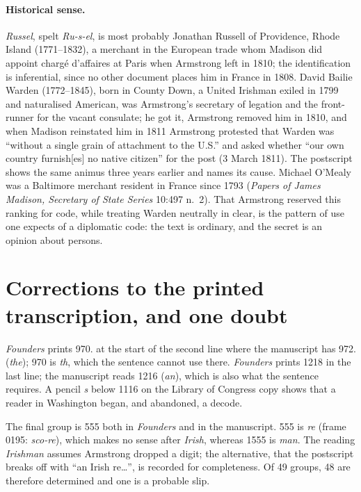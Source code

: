 \documentclass[]{interact}
\newcommand{\grp}[1]{\textsf{#1}}
\begin{document}
\paragraph{Historical sense.} \emph{Russel}, spelt \emph{Ru-s-el}, is most probably Jonathan Russell of Providence, Rhode Island (1771--1832), a merchant in the European trade whom Madison did appoint charg\'e d'affaires at Paris when Armstrong left in 1810; the identification is inferential, since no other document places him in France in 1808. David Bailie Warden (1772--1845), born in County Down, a United Irishman exiled in 1799 and naturalised American, was Armstrong's secretary of legation and the front-runner for the vacant consulate; he got it, Armstrong removed him in 1810, and when Madison reinstated him in 1811 Armstrong protested that Warden was ``without a single grain of attachment to the U.S.'' and asked whether ``our own country furnish[es] no native citizen'' for the post (3 March 1811). The postscript shows the same animus three years earlier and names its cause. Michael O'Mealy was a Baltimore merchant resident in France since 1793 (\emph{Papers of James Madison, Secretary of State Series} 10:497 n.~2). That Armstrong reserved this ranking for code, while treating Warden neutrally in clear, is the pattern of use one expects of a diplomatic code: the text is ordinary, and the secret is an opinion about persons.

\section{Corrections to the printed transcription, and one doubt}\label{sec:corr}

\emph{Founders} prints \grp{970.} at the start of the second line where the manuscript has \grp{972.} (\emph{the}); \grp{970} is \emph{th}, which the sentence cannot use there. \emph{Founders} prints \grp{1218} in the last line; the manuscript reads \grp{1216} (\emph{an}), which is also what the sentence requires. A pencil \emph{s} below \grp{1116} on the Library of Congress copy shows that a reader in Washington began, and abandoned, a decode.

The final group is \grp{555} both in \emph{Founders} and in the manuscript. \grp{555} is \emph{re} (frame 0195: \emph{sco-re}), which makes no sense after \emph{Irish}, whereas \grp{1555} is \emph{man}. The reading \emph{Irishman} assumes Armstrong dropped a digit; the alternative, that the postscript breaks off with ``an Irish re\ldots'', is recorded for completeness. Of 49 groups, 48 are therefore determined and one is a probable slip.
\end{document}
